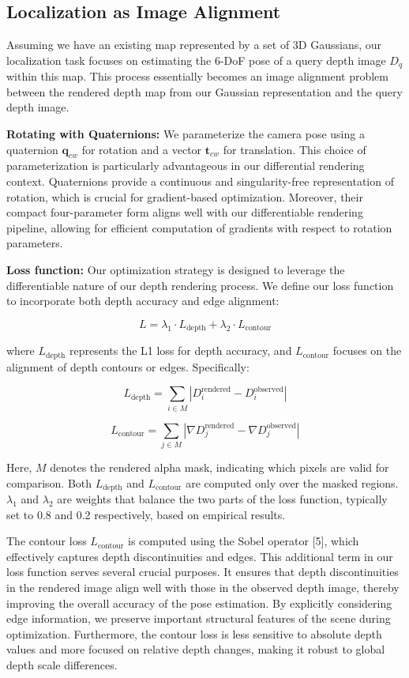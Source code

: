 \documentclass[twocolumn]{article} %
\begin{document}
\subsection{Localization as Image
Alignment}\label{localization-as-image-alignment}

Assuming we have an existing map represented by a set of 3D Gaussians,
our localization task focuses on estimating the 6-DoF pose of a query
depth image \(D_q\) within this map. This process essentially becomes an
image alignment problem between the rendered depth map from our Gaussian
representation and the query depth image.

\textbf{Rotating with Quaternions:} We parameterize the camera pose
using a quaternion \(\mathbf{q}_{cw}\) for rotation and a vector
\(\mathbf{t}_{cw}\) for translation. This choice of parameterization is
particularly advantageous in our differential rendering context.
Quaternions provide a continuous and singularity-free representation of
rotation, which is crucial for gradient-based optimization. Moreover,
their compact four-parameter form aligns well with our differentiable
rendering pipeline, allowing for efficient computation of gradients with
respect to rotation parameters.

\textbf{Loss function:} Our optimization strategy is designed to
leverage the differentiable nature of our depth rendering process. We
define our loss function to incorporate both depth accuracy and edge
alignment:

\[ 
L = \lambda_1 \cdot L_{\text{depth}} + \lambda_2 \cdot L_{\text{contour}} 
\]

where \(L_{\text{depth}}\) represents the L1 loss for depth accuracy,
and \(L_{\text{contour}}\) focuses on the alignment of depth contours or
edges. Specifically:

\[
L_{\text{depth}} = \sum_{i \in M} |D_i^{\text{rendered}} - D_i^{\text{observed}}|
\]

\[
L_{\text{contour}} = \sum_{j \in M} |\nabla D_j^{\text{rendered}} - \nabla D_j^{\text{observed}}|
\]

Here, \(M\) denotes the rendered alpha mask, indicating which pixels are
valid for comparison. Both \(L_{\text{depth}}\) and
\(L_{\text{contour}}\) are computed only over the masked regions.
\(\lambda_1\) and \(\lambda_2\) are weights that balance the two parts
of the loss function, typically set to 0.8 and 0.2 respectively, based
on empirical results.

The contour loss \(L_{\text{contour}}\) is computed using the Sobel
operator {[}5{]}, which effectively captures depth discontinuities and
edges. This additional term in our loss function serves several crucial
purposes. It ensures that depth discontinuities in the rendered image
align well with those in the observed depth image, thereby improving the
overall accuracy of the pose estimation. By explicitly considering edge
information, we preserve important structural features of the scene
during optimization. Furthermore, the contour loss is less sensitive to
absolute depth values and more focused on relative depth changes, making
it robust to global depth scale differences.
\end{document}
